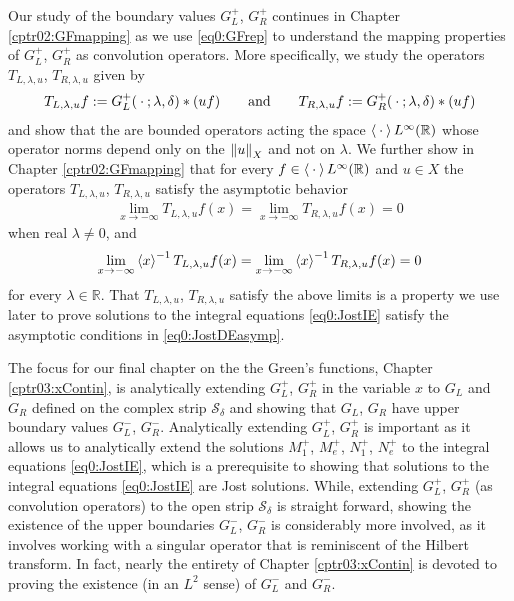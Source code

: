 \documentclass[../dissertation.tex]{subfiles}
\begin{document}
Our study of the boundary values $G_L^+$, $G_R^+$ continues in Chapter 
\ref{cptr02:GFmapping} as we use \ref{eq0:GFrep} to understand the mapping
properties of $G_L^+$, $G_R^+$ as convolution operators. More specifically, 
we study the operators $T_{L, \lambda, u}$, $T_{R, \lambda, u}$ given by
\begin{align}
	T_{L, \lambda, u} f:= G_L^+(\kern 0.5ex \cdot \kern 0.5ex; \lambda, \delta)*(uf) 
	\qquad \text{and} \qquad 
	T_{R, \lambda, u} f:= G_R^+(\kern 0.5ex \cdot \kern 0.5ex; \lambda, \delta)*(uf) 
\end{align}
and show that the are bounded operators acting the space 
$\left\langle \kern 0.5ex \cdot \kern 0.5ex \right\rangle L^\infty(\mathbb R)$ whose operator norms depend only 
on the $\left\| u \right\|_X$ and not on $\lambda$. We further show in Chapter 
\ref{cptr02:GFmapping} that for every 
$f \in \left\langle \kern 0.5ex \cdot \kern 0.5ex \right\rangle L^\infty(\mathbb R)$
and $u \in X$ the operators $T_{L, \lambda, u}$, $T_{R, \lambda, u}$
satisfy the asymptotic behavior
\begin{align*}
	\lim_{x\to-\infty} T_{L, \lambda, u} f(x) 
		= \lim_{x\to-\infty} T_{R, \lambda, u} f(x) 
		= 0
\end{align*}
when real $\lambda \ne 0$, and 
\begin{align*}
	\lim_{x\to-\infty} \left\langle x \right\rangle^{-1} T_{L, \lambda, u} f(x) 
		= \lim_{x\to-\infty} \left\langle x \right\rangle^{-1} T_{R, \lambda, u} f(x) 
		= 0
\end{align*}
for every $\lambda \in \mathbb R$. That $T_{L, \lambda, u}$, 
$T_{R, \lambda, u}$ satisfy the above limits is a property we use later to 
prove solutions to the integral equations \eqref{eq0:JostIE} satisfy the 
asymptotic conditions in \eqref{eq0:JostDEasymp}.

The focus for our final chapter on the the Green's functions, Chapter 
\ref{cptr03:xContin}, is analytically extending $G_L^+$, $G_R^+$ in 
the variable $x$ to $G_L$ and 
$G_R$ defined on the complex strip $\mathcal S_\delta$ and showing that $G_L$, $G_R$ 
have upper boundary values $G_L^-$, $G_R^-$. Analytically extending $G_L^+$, 
$G_R^+$ is important as it allows us to analytically extend the solutions 
$M_1^+$, $M_e^+$, $N_1^+$, $N_e^+$ to the integral equations \ref{eq0:JostIE},
which is a prerequisite to showing that solutions to the integral 
equations \ref{eq0:JostIE} are Jost solutions. While, extending $G_L^+$, $G_R^+$
(as convolution operators) to the open strip $\mathcal S_\delta$ is straight
forward, showing the existence of the upper boundaries $G_L^-$, $G_R^-$ is 
considerably more involved, as it involves working with a singular operator
that is reminiscent of the Hilbert transform. In fact, nearly the entirety of
Chapter \ref{cptr03:xContin} is devoted to proving the existence (in an $L^2$ 
sense) of $G_L^-$ and $G_R^-$.
\end{document}
